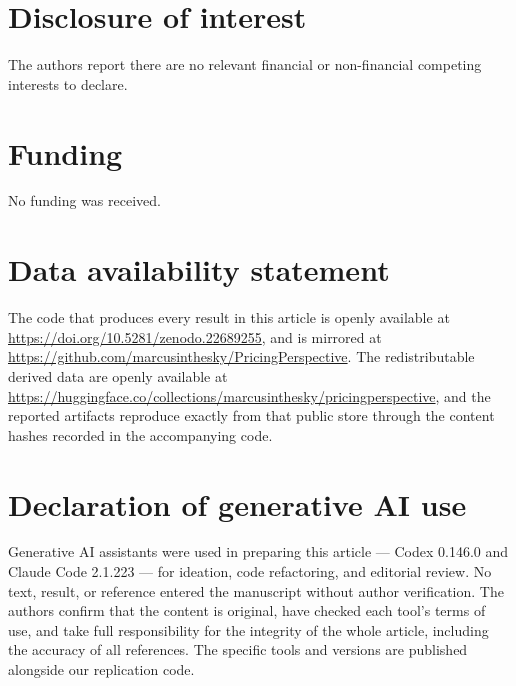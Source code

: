 \section*{Disclosure of interest}

The authors report there are no relevant financial or non-financial competing
interests to declare.

\section*{Funding}

No funding was received.

\section*{Data availability statement}

The code that produces every result in this article is openly available at
\url{https://doi.org/10.5281/zenodo.22689255}, and is mirrored at
\url{https://github.com/marcusinthesky/PricingPerspective}. The redistributable
derived data are openly available at
\url{https://huggingface.co/collections/marcusinthesky/pricingperspective}, and
the reported artifacts reproduce exactly from that public store through the
content hashes recorded in the accompanying code.

\section*{Declaration of generative AI use}

Generative AI assistants were used in preparing this article --- Codex
0.146.0 and Claude Code 2.1.223 --- for ideation, code refactoring, and
editorial review. No text, result, or reference entered the manuscript without
author verification. The authors confirm that the content is original, have
checked each tool's terms of use, and take full responsibility for the
integrity of the whole article, including the accuracy of all references.
The specific tools and versions are published alongside our replication code.
